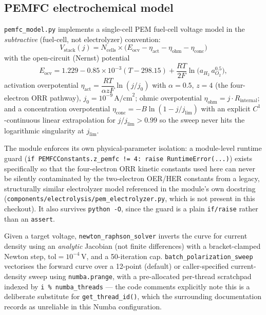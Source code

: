 \documentclass[twocolumn,10pt,a4paper]{article}
\newcommand{\code}[1]{\texttt{\small #1}}
\newcommand{\file}[1]{\texttt{#1}}
\begin{document}
\subsection{PEMFC electrochemical model}
\label{sec:pemfc}
\file{pemfc\_model.py} implements a single-cell PEM fuel-cell voltage model in the \emph{subtractive} (fuel-cell, not electrolyzer) convention:
\[
V_{\text{stack}}(j) = N_{\text{cells}} \times \big(E_{\text{ocv}} - \eta_{\text{act}} - \eta_{\text{ohm}} - \eta_{\text{conc}}\big)
\]
with the open-circuit (Nernst) potential
\[
E_{\text{ocv}} = 1.229 - 0.85\times10^{-3}(T-298.15) + \frac{RT}{2F}\ln\!\big(a_{H_2}\, a_{O_2}^{0.5}\big),
\]
activation overpotential $\eta_{\text{act}} = \dfrac{RT}{\alpha z F}\ln(j/j_0)$ with $\alpha=0.5$, $z=4$ (the four-electron ORR pathway), $j_0 = 10^{-9}\,\text{A/cm}^2$; ohmic overpotential $\eta_{\text{ohm}} = j \cdot R_{\text{internal}}$; and a concentration overpotential $\eta_{\text{conc}} = -B\ln(1-j/j_{\text{lim}})$ with an explicit $C^1$-continuous linear extrapolation for $j/j_{\text{lim}} > 0.99$ so the sweep never hits the logarithmic singularity at $j_{\text{lim}}$.

\begin{strengthbox}
The module enforces its own physical-parameter isolation: a module-level runtime guard (\code{if PEMFCConstants.z\_pemfc != 4: raise RuntimeError(...)}) exists specifically so that the four-electron ORR kinetic constants used here can never be silently contaminated by the two-electron OER/HER constants from a legacy, structurally similar electrolyzer model referenced in the module's own docstring (\file{components/electrolysis/pem\_electrolyzer.py}, which is not present in this checkout). It also survives \code{python -O}, since the guard is a plain \code{if/raise} rather than an \code{assert}.
\end{strengthbox}

Given a target voltage, \code{newton\_raphson\_solver} inverts the curve for current density using an \emph{analytic} Jacobian (not finite differences) with a bracket-clamped Newton step, $\text{tol}=10^{-4}\,\text{V}$, and a 50-iteration cap. \code{batch\_polarization\_sweep} vectorises the forward curve over a 12-point (default) or caller-specified current-density sweep using \code{numba.prange}, with a pre-allocated per-thread scratchpad indexed by \code{i \% numba\_threads} --- the code comments explicitly note this is a deliberate substitute for \code{get\_thread\_id()}, which the surrounding documentation records as unreliable in this Numba configuration.
\end{document}
